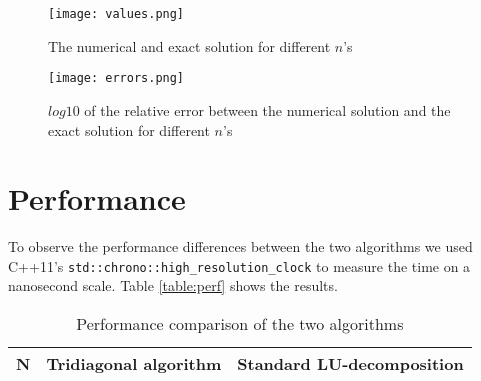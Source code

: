\documentclass[a4paper]{article}
\begin{document}
\begin{figure}
  \texttt{[image: values.png]}
  \caption{The numerical and exact solution for different $n$'s}
  \label{fig:values}
\end{figure}

\begin{figure}
  \texttt{[image: errors.png]}
  \caption{$log10$ of the relative error between the numerical solution
  and the exact solution for different $n$'s}
  \label{fig:errors}
\end{figure}

\section{Performance}

To observe the performance differences between the two algorithms we
used C++11's \texttt{std::chrono::high\_resolution\_clock} to measure
the time on a nanosecond scale. Table \vref{table:perf} shows the
results.

\begin{table}
  \centering
  \begin{tabular}{r | l | l}
    N & Tridiagonal algorithm & Standard LU-decomposition \\ \hline
    
  \end{tabular}
  \caption{Performance comparison of the two algorithms}
  \label{table:perf}
\end{table}
\end{document}
